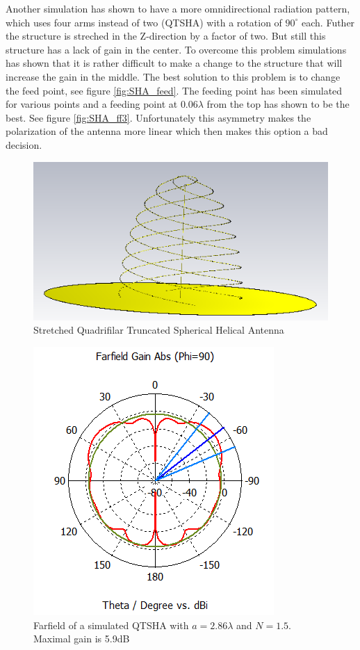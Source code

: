Another simulation has shown to have a more omnidirectional radiation pattern, which uses four arms instead of two (QTSHA) with a rotation of $90^\circ$ each. Futher the structure is streched in the Z-direction by a factor of two. But still this structure has a lack of gain in the center. To overcome this problem simulations has shown that it is rather difficult to make a change to the structure that will increase the gain in the middle. The best solution to this problem is to change the feed point, see figure \ref{fig:SHA_feed}. The feeding point has been simulated for various points and a feeding point at $0.06\lambda$ from the top has shown to be the best. See figure \ref{fig:SHA_ff3}. Unfortunately this asymmetry makes the polarization of the antenna more linear which then makes this option a bad decision.     

\begin{figure}[H]
\centering 
\includegraphics[scale = 0.7]{figures/antennas/hemispherical/hemispherical2}
\caption{Stretched Quadrifilar Truncated Spherical Helical Antenna}
\label{fig:SH32}
\end{figure} 

\begin{figure}[H]
\centering 
\includegraphics[scale = 0.7]{figures/antennas/hemispherical/hemispherical_farfield2}
\caption{Farfield of a simulated QTSHA with $a=2.86\lambda$ and $N=1.5$. Maximal gain is 5.9dB}
\label{fig:SHA_ff2}
\end{figure} 


